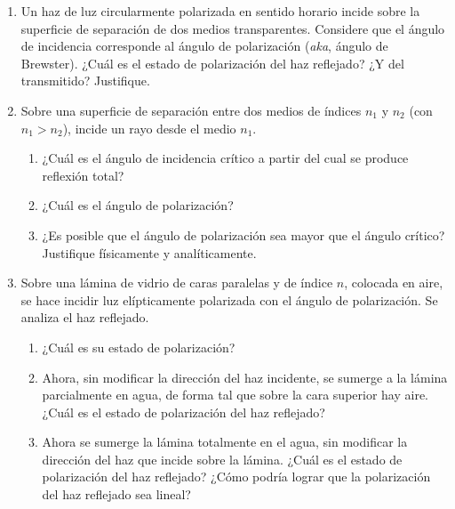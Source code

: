 \documentclass[11pt,spanish]{article}
\begin{document}
\begin{enumerate}

    \item Un haz de luz circularmente polarizada en sentido horario incide sobre
    la superficie de separación de dos medios transparentes. Considere que el
    ángulo de incidencia corresponde al ángulo de polarización (\textit{aka},
    ángulo de Brewster). ¿Cuál es el estado de polarización del haz reflejado?
    ¿Y del transmitido? Justifique.


    \item Sobre una superficie de separación entre dos medios de índices $n_{1}$
    y $n_{2}$ (con $n_{1}>n_{2}$), incide un rayo desde el medio $n_{1}$.

    \begin{enumerate}
        \item ¿Cuál es el ángulo de incidencia crítico a partir del cual se
        produce reflexión total?

        \item ¿Cuál es el ángulo de polarización?

        \item ¿Es posible que el ángulo de polarización sea mayor que el ángulo
        crítico? Justifique físicamente y analíticamente.
    \end{enumerate}

    
    \item Sobre una lámina de vidrio de caras paralelas y de índice $n$,
    colocada en aire, se hace incidir luz elípticamente polarizada con el ángulo
    de polarización. Se analiza el haz reflejado.

    \begin{enumerate}
        \item ¿Cuál es su estado de polarización?

        \item Ahora, sin modificar la dirección del haz incidente, se sumerge a
        la lámina parcialmente en agua, de forma tal que sobre la cara superior
        hay aire. ¿Cuál es el estado de polarización del haz reflejado?

        \item Ahora se sumerge la lámina totalmente en el agua, sin modificar la
        dirección del haz que incide sobre la lámina. ¿Cuál es el estado de
        polarización del haz reflejado? ¿Cómo podría lograr que la polarización
        del haz reflejado sea lineal?
    \end{enumerate}



\end{enumerate}
\end{document}
